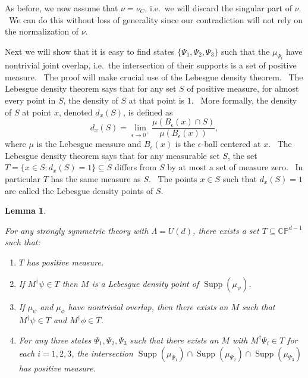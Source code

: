 \documentclass[letterpaper,11pt]{article}
\newtheorem{lem}{Lemma}
\DeclareMathOperator{\supp}{Supp}
\begin{document}
As before, we now assume that $\nu =\nu_{C}$, i.e.\ we will discard the singular part of $\nu$. \ We can do this without loss of generality since our contradiction will not rely on the normalization of $\nu$.

Next we will show that it is easy to find states $\{\Psi_1,\Psi_2,\Psi_3\}$ such that the $\mu_{\Psi_i}$ have nontrivial joint overlap, i.e.\ the intersection of their supports is a set of positive measure. \ The proof will make crucial use of the Lebesgue density theorem. \ The Lebesgue density theorem says that for any set $S$ of positive measure, for almost every point in $S$, the density of $S$ at that point is $1$. \ More formally, the density of $S$ at point $x$, denoted $d_x(S)$, is defined as
\[
d_x(S) = \lim_{\epsilon \rightarrow 0^+} \frac{\mu(B_{\epsilon}(x) \cap S)}{\mu(B_{\epsilon}(x))},
\]
where $\mu$ is the Lebesgue measure and $B_{\epsilon}(x)$ is the $\epsilon$-ball centered at $x$. \ The Lebesgue density theorem says that for any measurable set $S$, the set $T=\{x\in S : d_x(S)=1\}\subseteq S$ differs from $S$ by at most a set of measure zero. \ In particular $T$ has the same measure as $S$. \ The points $x\in S$ such that $d_x(S)=1$ are called the Lebesgue density points of $S$.

\begin{lem}
\label{lem:joint-overlap-properties}

For any strongly symmetric theory with $\Lambda=U(d)$, there exists a set $T\subseteq \mathbb{CP}^{d-1}$ such that:

\begin{enumerate}
\item $T$ has positive measure. \label{Tposmeas}
\item If $M^\dagger \psi \in T$ then $M$ is a Lebesgue density point of $\supp(\mu_\psi)$. \label{Tldp}
\item If $\mu_\psi$ and $\mu_\phi$ have nontrivial overlap, then there exists an $M$ such that $M^\dagger \psi \in T$ and $M^\dagger \phi \in T$. \label{Tintersection}
\item For any three states $\Psi_1,\Psi_2,\Psi_3$ such that there exists an $M$ with $M^\dagger \Psi_i \in T$ for each $i=1,2,3$, the intersection $\supp(\mu_{\Psi_1}) \cap \supp(\mu_{\Psi_2}) \cap \supp(\mu_{\Psi_3})$ has positive measure. \label{Tjointint}
\end{enumerate}

\end{lem}
\end{document}
